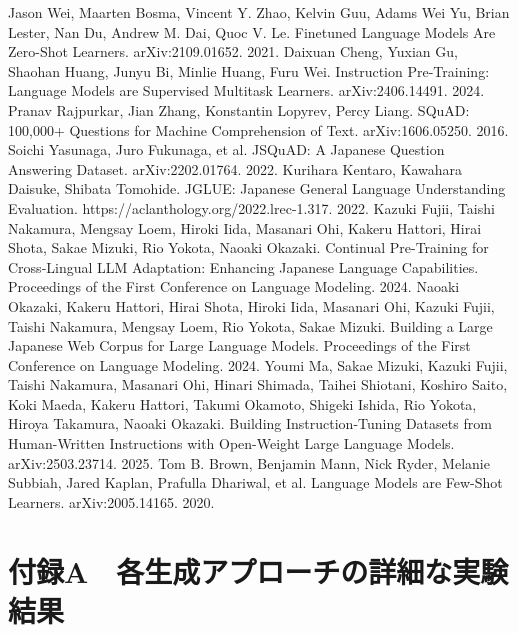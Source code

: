 \documentclass[a4paper,11pt]{jreport}
\begin{document}
\begin{thebibliography}{99}
  Jason Wei, Maarten Bosma, Vincent Y. Zhao, Kelvin Guu, Adams Wei Yu, Brian Lester, Nan Du, Andrew M. Dai, Quoc V. Le. Finetuned Language Models Are Zero-Shot Learners. arXiv:2109.01652. 2021.
  Daixuan Cheng, Yuxian Gu, Shaohan Huang, Junyu Bi, Minlie Huang, Furu Wei. Instruction Pre-Training: Language Models are Supervised Multitask Learners. arXiv:2406.14491. 2024.
  Pranav Rajpurkar, Jian Zhang, Konstantin Lopyrev, Percy Liang. SQuAD: 100,000+ Questions for Machine Comprehension of Text. arXiv:1606.05250. 2016.
  Soichi Yasunaga, Juro Fukunaga, et al. JSQuAD: A Japanese Question Answering Dataset. arXiv:2202.01764. 2022.
  Kurihara Kentaro, Kawahara Daisuke, Shibata Tomohide. JGLUE: Japanese General Language Understanding Evaluation. https://aclanthology.org/2022.lrec-1.317. 2022.
  Kazuki Fujii, Taishi Nakamura, Mengsay Loem, Hiroki Iida, Masanari Ohi, Kakeru Hattori, Hirai Shota, Sakae Mizuki, Rio Yokota, Naoaki Okazaki. Continual Pre-Training for Cross-Lingual LLM Adaptation: Enhancing Japanese Language Capabilities. Proceedings of the First Conference on Language Modeling. 2024.
  Naoaki Okazaki, Kakeru Hattori, Hirai Shota, Hiroki Iida, Masanari Ohi, Kazuki Fujii, Taishi Nakamura, Mengsay Loem, Rio Yokota, Sakae Mizuki. Building a Large Japanese Web Corpus for Large Language Models. Proceedings of the First Conference on Language Modeling. 2024.
  Youmi Ma, Sakae Mizuki, Kazuki Fujii, Taishi Nakamura, Masanari Ohi, Hinari Shimada, Taihei Shiotani, Koshiro Saito, Koki Maeda, Kakeru Hattori, Takumi Okamoto, Shigeki Ishida, Rio Yokota, Hiroya Takamura, Naoaki Okazaki. Building Instruction-Tuning Datasets from Human-Written Instructions with Open-Weight Large Language Models. arXiv:2503.23714. 2025.
  Tom B. Brown, Benjamin Mann, Nick Ryder, Melanie Subbiah, Jared Kaplan, Prafulla Dhariwal, et al. Language Models are Few-Shot Learners. arXiv:2005.14165. 2020.
\end{thebibliography}










\chapter*{付録A　各生成アプローチの詳細な実験結果}
\label{chap:appendix_a}
\end{document}
